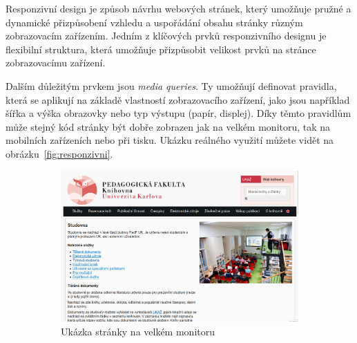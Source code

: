 \documentclass{csbulletin}
\begin{document}
Responzivní design je způsob návrhu webových stránek, který umožňuje
pružné a dynamické přizpůsobení vzhledu a uspořádání obsahu stránky
různým zobrazovacím zařízením. Jedním z klíčových prvků responzivního
designu je flexibilní struktura, která umožňuje přizpůsobit velikost
prvků na stránce zobrazovacímu zařízení.

Dalším důležitým prvkem jsou \textit{media queries}. 
Ty umožňují definovat
pravidla, která se aplikují na základě vlastností zobrazovacího
zařízení, jako jsou například šířka a výška obrazovky nebo typ výstupu (papír, displej). 
Díky těmto pravidlům může stejný kód stránky být dobře zobrazen jak na velkém
monitoru, tak na mobilních zařízeních nebo při tisku. Ukázku reálného využití 
můžete vidět na obrázku~\ref{fig:responzivni}.


\begin{figure}[tbp]
  \caption{Ukázka zobrazení webové stránky s využitím responzivního designu}\label{fig:responzivni}
\begin{subfigure}[t]{0.74\textwidth}
    \includegraphics[width=\textwidth]{img/pedf-web-big.png}
    \caption{Ukázka stránky na velkém monitoru}
\end{subfigure}
\hfill
\begin{subfigure}[t]{0.24\textwidth}

\end{subfigure}
\end{figure}
\end{document}
